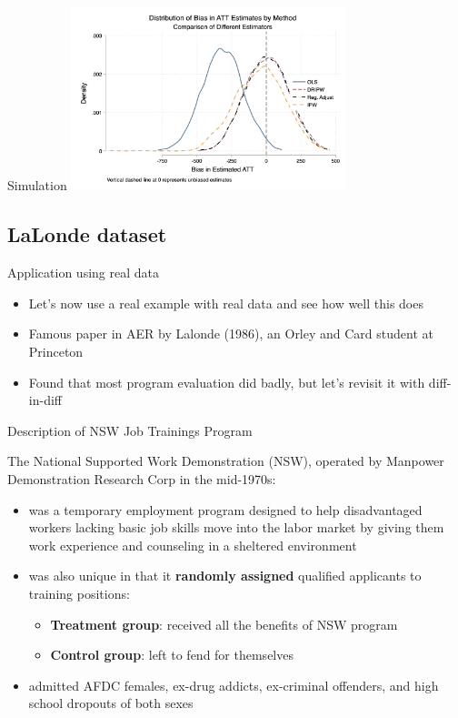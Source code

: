 \documentclass{beamer}
\begin{document}
\begin{frame}{Simulation}
    \centering
    \includegraphics[width=0.6\textwidth]{./lecture_includes/covariates.jpg}
\end{frame}



\subsection{LaLonde dataset}

\begin{frame}{Application using real data}

\begin{itemize}
\item Let's now use a real example with real data and see how well this does
\item Famous paper in AER by Lalonde (1986), an Orley and Card student at Princeton
\item Found that most program evaluation did badly, but let's revisit it with diff-in-diff
\end{itemize}

\end{frame}

\begin{frame}{Description of NSW Job Trainings Program}
	
The National Supported Work Demonstration (NSW), operated by Manpower Demonstration Research Corp in the mid-1970s:
	\begin{itemize}
	\item was a temporary employment program designed to help disadvantaged workers lacking basic job skills move into the labor market by giving them work experience and counseling in a sheltered environment
	\item was also unique in that it \textbf{randomly assigned} qualified applicants to training positions:
		\begin{itemize}
		\item \textbf{Treatment group}: received all the benefits of NSW program
		\item \textbf{Control group}: left to fend for themselves
		\end{itemize}
	\item admitted AFDC females, ex-drug addicts, ex-criminal offenders, and high school dropouts of both sexes
	\end{itemize}
\end{frame}
\end{document}
